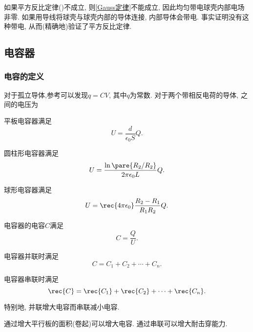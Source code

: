 \documentclass[../Electromagnetism.tex]{subfiles}
\begin{document}
\begin{ex}
	如果平方反比定律()不成立, 则\cref{Gauss定律}不能成立, 因此均匀带电球壳内部电场非零. 如果用导线将球壳与球壳内部的导体连接, 内部导体会带电. 事实证明没有这种带电, 从而(精确地)验证了平方反比定律.
\end{ex}



\subsection{电容器} %
\label{sub:电容器}

\subsubsection{电容的定义} %
\label{ssub:电容的定义}

对于孤立导体,参考可以发现$q=CV$, 其中$q$为常数. 对于两个带相反电荷的导体, 之间的电压为
\begin{finale}
	\begin{corollary}[特殊电容器]\quad
		\begin{cenum}
			\item 平板电容器满足
			\begin{equation}
				\label{eq:平行板电容器电容}
				U = \frac{d}{\epsilon_0 S}Q.
			\end{equation}
			\item 圆柱形电容器满足
			\[ U = \frac{\ln\pare{R_2/R_2}}{2\pi\epsilon_0 L}Q. \]
			\item 球形电容器满足
			\[ U = \rec{4\pi\epsilon_0}\frac{R_2 - R_1}{R_1 R_2}Q. \]
		\end{cenum}
	\end{corollary}
\end{finale}
\begin{definition}[电容]
	电容器的电容$C$满足
	\[ C = \frac{Q}{U}. \]
\end{definition}
\begin{finale}
	\begin{corollary}[电容器的并联与串联]\quad
		\begin{cenum}
			\item 电容器并联时满足
			\[ C = C_1 + C_2 + \cdots + C_n. \]
			\item 电容器串联时满足
			\[ \rec{C} = \rec{C_1} + \rec{C_2} + \cdots + \rec{C_n}. \]
		\end{cenum}
		特别地, 并联增大电容而串联减小电容.
	\end{corollary}
\end{finale}
\begin{ex}
	通过增大平行板的面积(卷起)可以增大电容. 通过串联可以增大耐击穿能力.
\end{ex}
\end{document}
